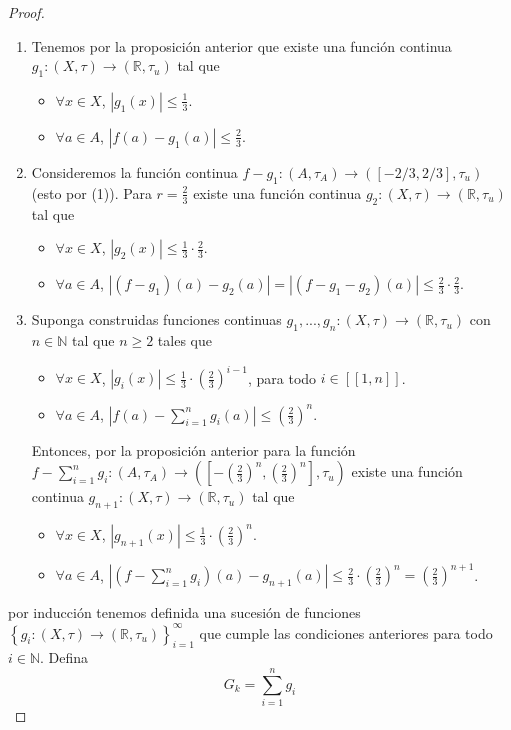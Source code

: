 \documentclass[12pt]{report}
\newcounter{it}
\theoremstyle{largebreak}
\newcommand\abs[1]{\ensuremath{\left|#1\right|}}
\newcommand\cf[3]{\ensuremath{#1:#2\rightarrow#3}}
\newcommand\natint[1]{\ensuremath{\left[\!\left[ #1\right]\!\right]}}
\begin{document}
\begin{proof}
        \begin{enumerate}
            \item Tenemos por la proposición anterior que existe una función continua $\cf{g_1}{(X,\tau)}{(\mathbb{R},\tau_u)}$ tal que
            \begin{itemize}
                \item $\forall x\in X$, $\abs{g_1(x)}\leq\frac{1}{3}$.
                \item $\forall a\in A$, $\abs{f(a)-g_1(a)}\leq\frac{2}{3}$.
            \end{itemize}
            \item Consideremos la función continua $\cf{f-g_1}{(A,\tau_A)}{([-2/3,2/3],\tau_u)}$ (esto por (1)). Para $r=\frac{2}{3}$ existe una función continua $\cf{g_2}{(X,\tau)}{(\mathbb{R},\tau_u)}$ tal que
            \begin{itemize}
                \item $\forall x\in X$, $\abs{g_2(x)}\leq\frac{1}{3}\cdot\frac{2}{3}$.
                \item $\forall a\in A$, $\abs{(f-g_1)(a)-g_2(a)}=\abs{(f-g_1-g_2)(a)}\leq\frac{2}{3}\cdot\frac{2}{3}$.
            \end{itemize}
            \item Suponga construidas funciones continuas $\cf{g_1,...,g_n}{(X,\tau)}{(\mathbb{R},\tau_u)}$ con $n\in\mathbb{N}$ tal que $n\geq 2$ tales que
            \begin{itemize}
                \item $\forall x\in X$, $\abs{g_i(x)}\leq\frac{1}{3}\cdot\left(\frac{2}{3}\right)^{i-1}$, para todo $i\in\natint{1,n}$.
                \item $\forall a\in A$, $\abs{f(a)-\sum_{ i=1}^n g_i(a)}\leq\left(\frac{2}{3}\right)^n$.
            \end{itemize}
            Entonces, por la proposición anterior para la función $\cf{f-\sum_{ i=1}^n g_i}{(A,\tau_A)}{\left(\left[-\left(\frac{2}{3}\right)^n,\left(\frac{2}{3}\right)^n\right],\tau_u\right) }$ existe una función continua $\cf{g_{ n+1}}{(X,\tau)}{(\mathbb{R},\tau_u)}$ tal que
            \begin{itemize}
                \item $\forall x\in X$, $\abs{g_{ n+1}(x)}\leq\frac{1}{3}\cdot\left(\frac{2}{3}\right)^n$.
                \item $\forall a\in A$, $\abs{(f-\sum_{ i=1}^n g_i)(a)-g_{ n+1}(a)}\leq\frac{2}{3}\cdot\left(\frac{2}{3}\right)^n=\left(\frac{2}{3}\right)^{n+1}$.
            \end{itemize}
        \end{enumerate}
        por inducción tenemos definida una sucesión de funciones $\left\{\cf{g_i}{(X,\tau)}{(\mathbb{R},\tau_u)} \right\}_{ i=1}^\infty$ que cumple las condiciones anteriores para todo $i\in\mathbb{N}$. Defina
        \begin{equation*}
            G_k=\sum_{ i=1}^n g_i
        \end{equation*}


\end{proof}
\end{document}
